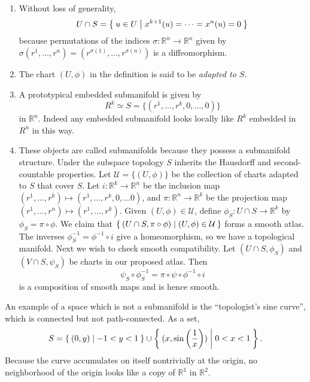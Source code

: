 \begin{remark}
  \begin{enumerate}
    \item{
      Without loss of generality,
      $$
      U \cap S = \Set{ u \in U | x^{k+1}(u) = \cdots = x^n(u) = 0 }
      $$
      because permutations of the indices
      $\sigma: \mathbb{R}^n \to \mathbb{R}^n$ given by
      $\sigma(r^1, \dots, r^n) = (r^{\sigma(1)}, \dots,
      r^{\sigma(n)})$ is a diffeomorphism.
    }
    \item{
      The chart $(U, \phi)$ in the definition is said to be
      \emph{adapted to $S$}.
    }
    \item{
      A prototypical embedded submanifold is given by
      $$
      R^k \simeq S = \{ (r^1, \dots, r^k, 0, \dots, 0) \}
      $$
      in $\mathbb{R}^n$. Indeed any embedded submanifold looks locally
      like $R^k$ embedded in $R^n$ in this way.
    }
    \item{
      These objects are called submanifolds because they possess a
      submanifold structure.
      Under the subspace topology $S$ inherits the Hausdorff and
      second-countable properties.
      Let $\mathcal{U} = \{ (U, \phi) \}$ be the collection of charts
      adapted to $S$ that cover $S$. Let $i: \mathbb{R}^k \to
      \mathbb{R}^n$ be the inclusion map
      $(r^1, \dots, r^k) \mapsto (r^1, \dots, r^k, 0, \dots 0)$, and
      $\pi: \mathbb{R}^n \to \mathbb{R}^k$ be the projection map
      $(r^1, \dots, r^n) \mapsto (r^1, \dots, r^k)$. Given
      $(U, \phi) \in \mathcal{U}$, define
      $\phi_S : U \cap S \to \mathbb{R}^k$ by $\phi_S = \pi \circ
      \phi$. We claim that
      $\Set{ (U \cap S, \pi \circ \phi) | (U, \phi) \in \mathcal{U}
      }$ forms a smooth atlas. The inverses
      $\phi_S^{-1} = \phi^{-1} \circ i$ give a homeomorphism, so we
      have a topological manifold. Next we wish to check smooth
      compatibility. Let $(U \cap S, \phi_S)$ and $(V \cap S, \psi_S)$
      be charts in our proposed atlas. Then
      $$
      \psi_S \circ \phi_S^{-1} = \pi \circ \psi \circ \phi^{-1} \circ i
      $$
      is a composition of smooth maps and is hence smooth.
    }
  \end{enumerate}
\end{remark}

\begin{xmpl}
An example of a space which is not a submanifold is the ``topologist's
sine curve'', which is connected but not path-connected. As a set,
$$
S = \Set{ (0, y) | -1 < y < 1 }
\cup \Set{ (x, \sin\left(\frac{1}{x}\right)) | 0 < x < 1 }.
$$
Because the curve accumulates on itself nontrivially at the origin, no
neighborhood of the origin looks like a copy of $\mathbb{R}^1$ in $\mathbb{R}^2$.
\end{xmpl}


